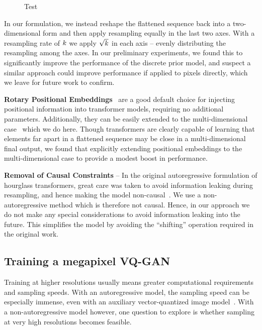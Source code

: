 \begin{figure}
    \centering
    
    \caption{
        Test
    }
\end{figure}


In our formulation, we instead reshape the flattened sequence back into a
two-dimensional form and then apply resampling equally in the last two axes.
With a resampling rate of $k$ we apply $\sqrt{k}$ in
each axis -- evenly distributing the resampling among the axes. In our
preliminary experiments, we found this to significantly improve the performance
of the discrete prior model, and suspect a similar approach could improve
performance if applied to pixels directly, which we leave for future work to
confirm.

\textbf{Rotary Positional Embeddings}~\cite{su2021roformer} are a good default
choice for injecting positional information into transformer models, requiring
no additional parameters. Additionally, they can be easily extended to the
multi-dimensional case~\cite{rope-eleutherai} which we do here. Though
transformers are clearly capable of learning that elements far apart in a
flattened sequence may be close in a multi-dimensional final output, we found
that explicitly extending positional embeddings to the multi-dimensional case to
provide a modest boost in performance.

\textbf{Removal of Causal Constraints} -- In the original autoregressive
formulation of hourglass transformers, great care was taken to avoid information
leaking during resampling, and hence making the model
non-causal~\cite{nawrot2021hierarchical}. We use a non-autoregressive method
which is therefore not causal. Hence, in our approach we do not make any special
considerations to avoid information leaking into the future. This simplifies the
model by avoiding the ``shifting'' operation required in the original work.

\subsection{Training a megapixel VQ-GAN}
\label{sec:megagan}

Training at higher resolutions usually means greater computational requirements
and sampling speeds. With an autoregressive model, the sampling speed can be
especially immense, even with an auxiliary vector-quantized image
model~\cite{esser2021taming}. With a non-autoregressive model however, one
question to explore is whether sampling at very high resolutions becomes
feasible.

